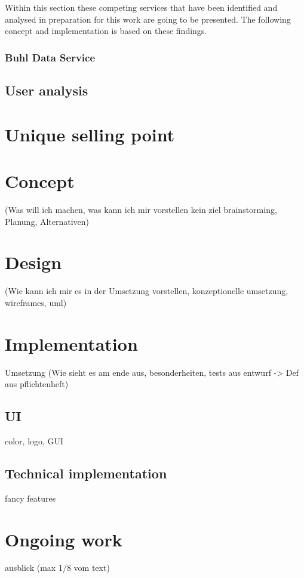 Within this section these competing services that have been identified and analysed in preparation for this work are going to be presented. The following concept and implementation is based on these findings.

\subsection{Buhl Data Service}

\section{User analysis}

\chapter{Unique selling point}

\chapter{Concept}
(Was will ich machen, was kann ich mir vorstellen kein ziel brainstorming, Planung, Alternativen)

\chapter{Design}
(Wie kann ich mir es in der Umsetzung vorstellen, konzeptionelle umsetzung, wireframes, uml)

\chapter{Implementation}
Umsetzung (Wie sieht es am ende aus, besonderheiten, tests aus entwurf -> Def aus pflichtenheft)

\section{UI}
color, logo, GUI

\section{Technical implementation}

fancy features

\chapter{Ongoing work}
ausblick (max 1/8 vom text)

